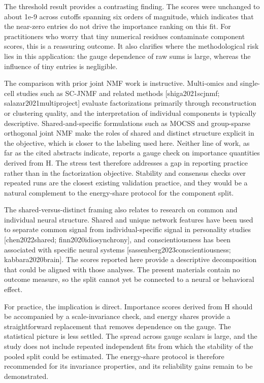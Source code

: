 \documentclass{article}
\begin{document}
The threshold result provides a contrasting finding. The scores were unchanged to about 1e-9 across cutoffs spanning six orders of magnitude, which indicates that the near-zero entries do not drive the importance ranking on this fit. For practitioners who worry that tiny numerical residues contaminate component scores, this is a reassuring outcome. It also clarifies where the methodological risk lies in this application: the gauge dependence of raw sums is large, whereas the influence of tiny entries is negligible.

The comparison with prior joint NMF work is instructive. Multi-omics and single-cell studies such as SC-JNMF and related methods [shiga2021scjnmf; salazar2021multiproject] evaluate factorizations primarily through reconstruction or clustering quality, and the interpretation of individual components is typically descriptive. Shared-and-specific formulations such as MOCSS and group-sparse orthogonal joint NMF \cite{peng2020group} make the roles of shared and distinct structure explicit in the objective, which is closer to the labeling used here. Neither line of work, as far as the cited abstracts indicate, reports a gauge check on importance quantities derived from H. The stress test therefore addresses a gap in reporting practice rather than in the factorization objective. Stability and consensus checks over repeated runs are the closest existing validation practice, and they would be a natural complement to the energy-share protocol for the component split.

The shared-versus-distinct framing also relates to research on common and individual neural structure. Shared and unique network features have been used to separate common signal from individual-specific signal in personality studies [chen2022shared; finn2020idiosynchrony], and conscientiousness has been associated with specific neural systems [sassenberg2023conscientiousness; kabbara2020brain]. The scores reported here provide a descriptive decomposition that could be aligned with those analyses. The present materials contain no outcome measure, so the split cannot yet be connected to a neural or behavioral effect.

For practice, the implication is direct. Importance scores derived from H should be accompanied by a scale-invariance check, and energy shares provide a straightforward replacement that removes dependence on the gauge. The statistical picture is less settled. The spread across gauge scalars is large, and the study does not include repeated independent fits from which the stability of the pooled split could be estimated. The energy-share protocol is therefore recommended for its invariance properties, and its reliability gains remain to be demonstrated.
\end{document}
